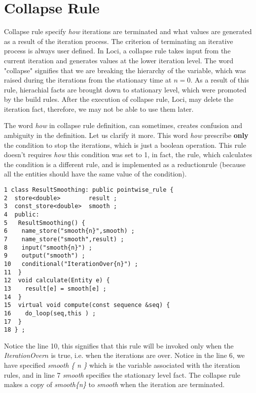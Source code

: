\section {Collapse Rule}
\par  Collapse rule specify {\em how } iterations are terminated and what values are generated
as a result of the iteration process. The criterion of terminating an iterative process is
always user defined. In Loci, a collapse rule takes input from the current iteration
and generates values at the lower iteration level. The word "collapse" signifies that we 
are breaking the hierarchy of the variable, which was raised during the iterations from 
the stationary time at $n=0$. As a result of this rule, hierachial facts are brought 
down to stationary level, which were promoted by the build rules. After the execution of 
collapse rule, Loci, may delete the iteration fact, therefore, we may not be able to use 
them later.
\par The word {\em how } in collapse rule definition, can sometimes, creates confusion and 
ambiguity in the definition. Let
us clarify it more. This word {\em how }prescribe {\bf only} the  condition to stop the iterations, 
which is just a boolean operation. This rule doesn't requires {\em how} this condition was set to 
1, in fact, the rule, which calculates the condition is a different rule, and is 
implemented as a reductionrule (because all the entities should have the same value of
the condition). 
%
\begin{verbatim}
1 class ResultSmoothing: public pointwise_rule {
2  store<double>        result ;
3  const_store<double>  smooth ;
4  public:
5   ResultSmoothing() {
6    name_store("smooth{n}",smooth) ;
7    name_store("smooth",result) ;
8    input("smooth{n}") ;
9    output("smooth") ;
10   conditional("IterationOver{n}") ;
11  }
12  void calculate(Entity e) {
13    result[e] = smooth[e] ;
14  }
15  virtual void compute(const sequence &seq) {
16    do_loop(seq,this ) ;
17  }
18 } ;
\end{verbatim}
\par Notice the line 10, this signifies that this rule will be invoked only when the
{\em IterationOver${n}$} is true, i.e. when the iterations are over. Notice in the 
line 6, we have specified {\em smooth \{ n \}} which is the variable associated with the
iteration rules, and in line 7 {\em smooth} specifies the stationary level fact. The
collapse rule makes a copy of {\em smooth\{n\}} to {\em smooth} when the iteration are 
terminated. 


